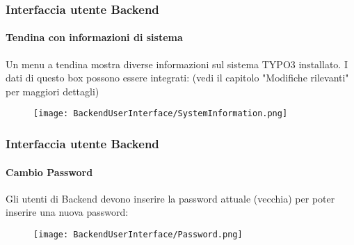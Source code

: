 \begin{frame}[fragile]
	\frametitle{Interfaccia utente Backend}
	\framesubtitle{Tendina con informazioni di sistema}

	Un menu a tendina mostra diverse informazioni sul sistema TYPO3 installato.
	I dati di questo box possono essere integrati:\newline
	\small(vedi il capitolo "Modifiche rilevanti" per maggiori dettagli)\normalsize

	\begin{figure}
		\texttt{[image: BackendUserInterface/SystemInformation.png]}
	\end{figure}

\end{frame}

\begin{frame}[fragile]
	\frametitle{Interfaccia utente Backend}
	\framesubtitle{Cambio Password}

	Gli utenti di Backend devono inserire la password attuale (vecchia) per poter inserire
	una nuova password:

	\begin{figure}
		\texttt{[image: BackendUserInterface/Password.png]}
	\end{figure}

\end{frame}

